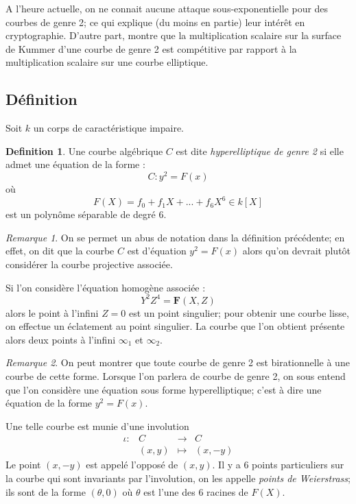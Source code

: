 \documentclass[a4paper]{article}
\theoremstyle{definition}
\newtheorem{definition}{Definition}[section]
\theoremstyle{remark}
\newtheorem{remarque}{Remarque}
\numberwithin{equation}{section}
\begin{document}
A l'heure actuelle, on ne connait aucune attaque sous-exponentielle pour des courbes de genre 2; ce qui explique (du moins en partie) leur intérêt en cryptographie.
D'autre part, \citet{gaudry} montre que la multiplication scalaire sur la surface de Kummer d'une courbe de genre 2 est compétitive par rapport à la multiplication scalaire sur une courbe elliptique.

\subsection{Définition}
Soit $k$ un corps de caractéristique impaire.

\begin{definition}
Une courbe algébrique $C$ est dite \emph{hyperelliptique de genre 2} si elle admet une équation de la forme :
$$C : y^2 = F(x)$$
où $$F(X) = f_0 + f_1X + ... + f_6X^6 \in k[X]$$
est un polynôme séparable de degré 6.
\end{definition}

\begin{remarque}
On se permet un abus de notation dans la définition précédente; en effet, on dit que la courbe $C$ est d'équation $y^2 = F(x)$ alors qu'on devrait plutôt considérer la courbe projective associée.

Si l'on considère l'équation homogène associée :
$$Y^2Z^4 = \mathbf{F}(X,Z)$$
alors le point à l'infini $Z=0$ est un point singulier; pour obtenir une courbe lisse, on effectue un éclatement au point singulier. La courbe que l'on obtient présente alors deux points à l'infini $\infty_1$ et $\infty_2$.
\end{remarque}

\begin{remarque}
On peut montrer \citep{cassels-Flynn} que toute courbe de genre 2 est birationnelle à une courbe de cette forme. Lorsque l'on parlera de courbe de genre 2, on sous entend que l'on considère une équation sous forme hyperelliptique; c'est à dire une équation de la forme $y^2 = F(x)$.
\end{remarque}

Une telle courbe est munie d'une involution 
\begin{equation*}
\begin{array}{lrcl}
\iota :&C & \longrightarrow & C \\
& (x,y) & \longmapsto & (x,-y)
\end{array}
\end{equation*}
Le point $(x,-y)$ est appelé l'opposé de $(x,y)$. Il y a 6 points particuliers sur la courbe qui sont invariants par l'involution, on les appelle \emph{points de Weierstrass}; ils sont de la forme $(\theta,0)$ où $\theta$ est l'une des 6 racines de $F(X)$.
\end{document}
